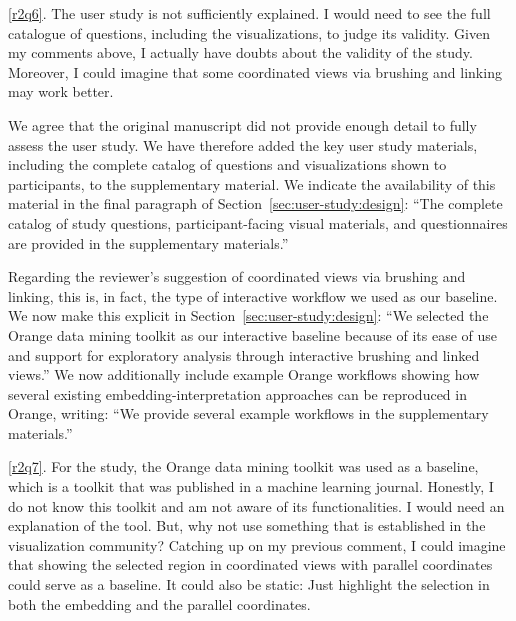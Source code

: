\documentclass[11pt]{article}
\newcounter{rtaskno}
\newcommand{\rtask}[1]{\refstepcounter{rtaskno}\label{#1}}
\newcommand{\reviewc}[2]{\begin{leftbar}\noindent\rtask{#1}\ref{#1}. #2\end{leftbar}\vspace*{-4mm}}
\newcommand{\answer}[1]{\noindent #1\par\vspace{2mm}}
\newlength{\leftbarwidth}
\newlength{\leftbarsep}
\renewenvironment{leftbar}{%
    \def\FrameCommand{{\color{black}{\vrule width \leftbarwidth\relax\hspace {\leftbarsep}}}}%
    \MakeFramed {\advance \hsize -\width \FrameRestore }%
}{\endMakeFramed}
\begin{document}
\reviewc{r2q6}{The user study is not sufficiently explained. I would need to see the full catalogue of questions, including the visualizations, to judge its validity. Given my comments above, I actually have doubts about the validity of the study. Moreover, I could imagine that some coordinated views via brushing and linking may work better.}

\answer{%
We agree that the original manuscript did not provide enough detail to fully assess the user study. We have therefore added the key user study materials, including the complete catalog of questions and visualizations shown to participants, to the supplementary material. We indicate the availability of this material in the final paragraph of Section~\ref{sec:user-study:design}: ``The complete catalog of study questions, participant-facing visual materials, and questionnaires are provided in the supplementary materials.''

Regarding the reviewer's suggestion of coordinated views via brushing and linking, this is, in fact, the type of interactive workflow we used as our baseline.
We now make this explicit in Section~\ref{sec:user-study:design}: ``We selected the Orange data mining toolkit as our interactive baseline because of its ease of use and support for exploratory analysis through interactive brushing and linked views.'' We now additionally include example Orange workflows showing how several existing embedding-interpretation approaches can be reproduced in Orange, writing: ``We provide several example workflows in the supplementary materials.''
}


\reviewc{r2q7}{For the study, the Orange data mining toolkit was used as a baseline, which is a toolkit that was published in a machine learning journal. Honestly, I do not know this toolkit and am not aware of its functionalities. I would need an explanation of the tool. But, why not use something that is established in the visualization community? Catching up on my previous comment, I could imagine that showing the selected region in coordinated views with parallel coordinates could serve as a baseline. It could also be static: Just highlight the selection in both the embedding and the parallel coordinates.}
\end{document}
